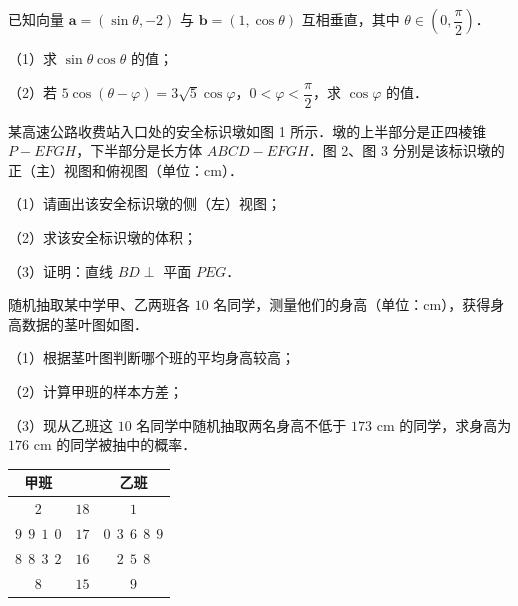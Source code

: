 \begin{question}
已知向量 $\boldsymbol a=(\sin\theta,-2)$ 与 $\boldsymbol b=(1,\cos\theta)$ 互相垂直，其中 $\theta\in\left(0,\dfrac{\pi}{2}\right)$．

（1）求 $\sin\theta\cos\theta$ 的值；

（2）若 $5\cos(\theta-\varphi)=3\sqrt5\cos\varphi$，$0<\varphi<\dfrac{\pi}{2}$，求 $\cos\varphi$ 的值．

\Needspace{0.4\textheight}
\end{question}
\begingroup
\renewenvironment{question}{\Needspace{0.5\textheight}}{}
\begin{question}
某高速公路收费站入口处的安全标识墩如图 1 所示．墩的上半部分是正四棱锥 $P-EFGH$，下半部分是长方体 $ABCD-EFGH$．图 2、图 3 分别是该标识墩的正（主）视图和俯视图（单位：cm）．

（1）请画出该安全标识墩的侧（左）视图；

（2）求该安全标识墩的体积；

（3）证明：直线 $BD\perp$ 平面 $PEG$．
\nopagebreak[4]
\begin{center}\end{center}
\nopagebreak[4]
\end{question}
\endgroup
\begingroup
\renewenvironment{question}{\Needspace{0.45\textheight}}{}
\begin{question}
随机抽取某中学甲、乙两班各 $10$ 名同学，测量他们的身高（单位：cm），获得身高数据的茎叶图如图．

（1）根据茎叶图判断哪个班的平均身高较高；

（2）计算甲班的样本方差；

（3）现从乙班这 $10$ 名同学中随机抽取两名身高不低于 $173$ cm 的同学，求身高为 $176$ cm 的同学被抽中的概率．

\begin{center}
\begin{tabular}{ccc}
\toprule
甲班 &  & 乙班 \\
\midrule
$2$ & $18$ & $1$ \\
$9\ \ 9\ \ 1\ \ 0$ & $17$ & $0\ \ 3\ \ 6\ \ 8\ \ 9$ \\
$8\ \ 8\ \ 3\ \ 2$ & $16$ & $2\ \ 5\ \ 8$ \\
$8$ & $15$ & $9$ \\
\bottomrule
\end{tabular}
\end{center}

\end{question}
